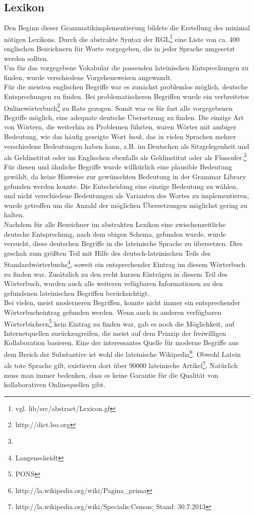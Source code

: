 \documentclass[draft,11pt]{scrartcl}
\begin{document}
\subsection{Lexikon}
Den Beginn dieser Grammatikimplementierung bildete die Erstellung des minimal nötigen Lexikons. Durch die abstrakte Syntax der RGL\footnote{vgl. lib/src/abstract/Lexicon.gf} eine Liste von ca. 400 englischen Bezeichnern für Worte vorgegeben, die in jeder Sprache umgesetzt werden sollten. \\
Um für das vorgegebene Vokabular die passenden lateinischen Entsprechungen zu finden, wurde verschiedene Vorgehensweisen angewandt. \\
Für die meisten englischen Begriffe war es zunächst problemlos möglich, deutsche Entsprechungen zu finden. Bei problematischeren Begriffen wurde ein verbreitetes Onlinewörterbuch\footnote{http://dict.leo.org} zu Rate gezogen. Somit war es für fast alle vorgegebenen Begriffe möglich, eine adequate deutsche Übersetzung zu finden. Die einzige Art von Wörtern, die weiterhin zu Problemen führten, waren Wörter mit ambiger Bedeutung, wie das häufig gezeigte Wort \textit{bank}, das in vielen Sprachen mehrer verschiedene Bedeutungen haben kann, z.B. im Deutschen als Sitzgelegenheit und als Geldinstitut oder im Englischen ebenfalls als Geldinstitut oder als Flussufer.\footnote{} Für diesen und ähnliche Begriffe wurde willkürlich eine plausible Bedeutung gewählt, da keine Hinweise zur gewünschten Bedeutung in der Grammar Library gefunden werden konnte. Die Entscheidung eine einzige Bedeutung zu wählen, und nicht verschiedene Bedeutungen als Varianten des Wortes zu implementieren, wurde getroffen um die Anzahl der möglichen Übersetzungen möglichst gering zu halten. \\
Nachdem für alle Bezeichner im abstrakten Lexikon eine zwischenzeitliche deutsche Entsprechung, nach dem obigen Schema, gefunden wurde, wurde versucht, diese deutschen Begriffe in die lateinische Sprache zu übersetzen. Dies geschah zum größten Teil mit Hilfe des deutsch-lateinischen Teils des Standardwörterbuchs\footnote{Langenscheidt}, soweit ein entsprechender Eintrag im diesem Wörterbuch zu finden war. Zusätzlich zu den recht kurzen Einträgen in diesem Teil des Wörterbuch, wurden auch alle weiteren vefügbaren Informationen zu den gefundenen lateinischen Begriffen berücksichtigt. \\
Bei vielen, meist moderneren Begriffen, konnte nicht immer ein entsprechender Wörterbucheintrag gefunden werden. Wenn auch in anderen verfügbaren Wörterbüchern\footnote{PONS} kein Eintrag zu finden war, gab es noch die Möglichkeit, auf Internetquellen zurückzugreifen, die meist auf dem Prinzip der freiwilligen Kollaboration basieren. Eine der interessantes Quelle für moderne Begriffe aus dem Breich der Substantive ist wohl die lateinische Wikipedia\footnote{http://la.wikipedia.org/wiki/Pagina\_prima}. Obwohl Latein als tote Sprache gilt, existieren dort über 90000 lateinische Artikel\footnote{http://la.wikipedia.org/wiki/Specialis:Census; Stand: 30.7.2013}. Natürlich muss man immer bedenken, dass es keine Garantie für die Qualität von kollaborativen Onlinequellen gibt.
\end{document}

